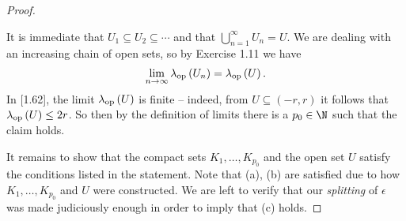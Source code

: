 \documentclass[pmath450]{subfiles}
\begin{document}
\begin{proof}
\begin{itemize}
                \begin{subproof}
                    It is immediate that $U_1\subseteq U_2\subseteq\cdots$ and that $\bigcup^{\infty}_{n=1}U_n=U$. We are dealing with an increasing chain of open sets, so by Exercise 1.11 we have
                    \begin{equation}
                        \lim_{n\to\infty}\lambda_{\operatorname{op}}\left( U_n \right) = \lambda_{\operatorname{op}}\left( U \right).
                    \end{equation}
                    In [1.62], the limit $\lambda_{\operatorname{op}}\left( U \right)$ is finite -- indeed, from $U\subseteq\left( -r,r \right)$ it follows that $\lambda_{\operatorname{op}}\left( U \right)\leq 2r$. So then by the definition of limits there is a $p_0\in\N$ such that the claim holds.
                \end{subproof}
        \end{itemize} 
        It remains to show that the compact sets $K_1,\ldots,K_{p_0}$ and the open set $U$ satisfy the conditions listed in the statement. Note that (a), (b) are satisfied due to how $K_1,\ldots,K_{p_0}$ and $U$ were constructed. We are left to verify that our \textit{splitting} of $\epsilon$ was made judiciously enough in order to imply that (c) holds.


\end{proof}
\end{document}
